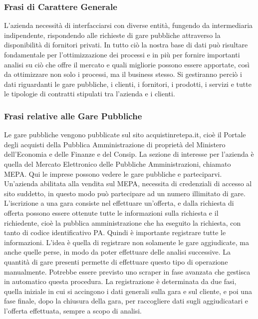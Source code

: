 
\subsubsection{Frasi di Carattere Generale}
L'azienda necessità di interfacciarsi con diverse entità, fungendo da intermediaria indipendente, rispondendo alle richieste di gare pubbliche attraverso la disponibilità di fornitori privati. In tutto ciò la nostra base di dati può risultare fondamentale per l'ottimizzazione dei processi e in più per fornire importanti analisi su ciò che offre il mercato e quali migliorie possono essere apportate, così da ottimizzare non solo i processi, ma il business stesso.\newline
Si gestiranno perciò i dati riguardanti le gare pubbliche, i clienti, i fornitori, i prodotti, i servizi e tutte le tipologie di contratti stipulati tra l'azienda e i clienti.

\subsubsection{Frasi relative alle Gare Pubbliche}
Le gare pubbliche vengono pubblicate sul sito acquistinretepa.it, cioè il Portale degli acquisti della Pubblica Amministrazione di proprietà del Ministero dell'Economia e delle Finanze e del Consip.\newline
La sezione di interesse per l'azienda è quella del Mercato Elettronico delle Pubbliche Amministrazioni, chiamato MEPA. Qui le imprese possono vedere le gare pubbliche e parteciparvi.\newline
Un'azienda abilitata alla vendita sul MEPA, necessita di credenziali di accesso al sito suddetto, in questo modo può partecipare ad un numero illimitato di gare.\newline
L'iscrizione a una gara consiste nel effettuare un'offerta, e dalla richiesta di offerta possono essere ottenute tutte le informazioni sulla richiesta e il richiedente, cioè la pubblica amministrazione che ha eseguito la richiesta, con tanto di codice identificativo PA.\newline
Quindi è importante registrare tutte le informazioni. L'idea è quella di registrare non solamente le gare aggiudicate, ma anche quelle perse, in modo da poter effettuare delle analisi successive. La quantità di gare presenti permette di effettuare questo tipo di operazione manualmente. Potrebbe essere previsto uno scraper in fase avanzata che gestisca in automatico questa procedura.\newline
La registrazione è determinata da due fasi, quella iniziale in cui si accingono i dati generali sulla gara e sul cliente, e poi una fase finale, dopo la chiusura della gara, per raccogliere dati sugli aggiudicatari e l'offerta effettuata, sempre a scopo di analisi.

